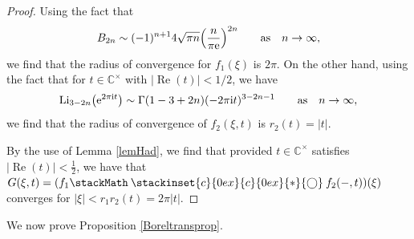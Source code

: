 \documentclass[pdftex]{sigma}
\newcommand\oast{\stackMath\mathbin{\stackinset{c}{0ex}{c}{0ex}{\ast}{\bigcirc}}}
\numberwithin{equation}{section}
\begin{document}
\begin{proof}
Using the fact that
\begin{equation*}
 B_{2n}\sim (-1)^{n+1}4\sqrt{\pi n}\Big(\frac{n}{\pi {\rm e}}\Big)^{2n} \qquad \text{as} \quad n\to \infty,
\end{equation*}
we find that the radius of convergence for $f_1(\xi)$ is $2\pi$. On the other hand, using the fact that for $t\in \mathbb{C}^{\times}$ with $|\operatorname{Re}(t)|<1/2$, we have
\begin{equation*}
 \mathrm{Li}_{3-2n}\big({\rm e}^{2\pi \mathrm{i} t}\big)\sim \Gamma(1-3+2n)(-2\pi \mathrm{i} t)^{3-2n-1} \qquad \text{as}\quad n\to \infty,
\end{equation*}
we find that the radius of convergence of $f_2(\xi,t)$ is $r_2(t)=|t|$.

By the use of Lemma \ref{lemHad}, we find that provided $t\in \mathbb{C}^{\times}$ satisfies $|\operatorname{Re}(t)|<\frac12$, we have that $G(\xi,t)=(f_1\oast f_2(-,t))(\xi)$ converges for $|\xi|<r_1r_2(t)=2\pi |t|$.
\end{proof}

We now prove Proposition \ref{Boreltransprop}.
\end{document}
